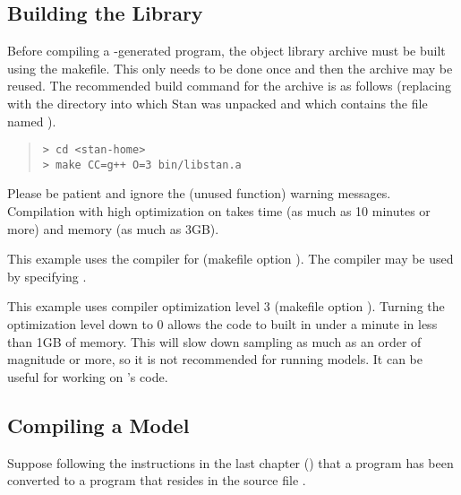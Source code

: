 \subsection{Building the \Stan Library}

Before compiling a \Stan-generated \Cpp program, the \Stan object
library archive must be built using the makefile.  This only needs to
be done once and then the archive may be reused.  The recommended
build command for the \Stan archive is as follows (replacing
 with the directory into which Stan was unpacked and
which contains the file named ).
%
\begin{quote}
\begin{Verbatim}[fontshape=sl,fontsize=\small]
> cd <stan-home>
> make CC=g++ O=3 bin/libstan.a 
\end{Verbatim}
\end{quote}
%
Please be patient and ignore the (unused function) warning messages.
Compilation with high optimization on  takes time (as much
as 10 minutes or more) and memory (as much as 3GB). 

This example uses the  compiler for \Cpp (makefile option
).  The \clang compiler may be used by specifying
.

This example uses compiler optimization level 3 (makefile option
).  Turning the optimization level down to 0 allows the code
to built in under a minute in less than 1GB of memory.  This will slow
down sampling as much as an order of magnitude or more, so it is not
recommended for running models.  It can be useful for working on
\Stan's \Cpp code.


\subsection{Compiling a \Stan Model}

Suppose following the instructions in the last chapter
() that a \Stan program has been converted to a \Cpp
program that resides in the source file .

